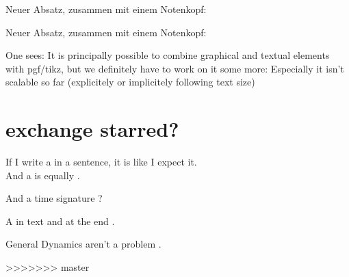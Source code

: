 \documentclass{scrartcl}
\begin{document}
\Large
Neuer Absatz, zusammen mit einem Notenkopf: 

\normalsize
Neuer Absatz, zusammen mit einem Notenkopf: 

One sees: It is principally possible to combine graphical and textual elements with pgf/tikz,
but we definitely have to work on it some more: Especially it isn't scalable so far (explicitely or implicitely following text size)

\section*{exchange starred?}

If I write a \flat in a sentence, it is like I expect it.\\
And a \lilyRFZ is equally \lilyRF.

And a time signature ?

A \lilyRFZ in text and at the end \lilyRFZ*.

General Dynamics  aren't a problem .


	
>>>>>>> master
\end{document}
